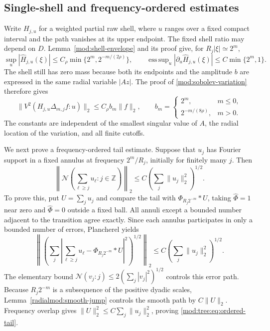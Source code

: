 \documentclass[11pt]{article}
\numberwithin{equation}{section}
\theoremstyle{remark}
\theoremstyle{definition}
\newcommand{\NN}{\mathcal N}
\DeclareMathOperator*{\esssup}{ess\,sup}
\begin{document}
\subsection{Single-shell and frequency-ordered estimates}

Write $H_{j,u}$ for a weighted partial raw shell, where $u$ ranges over
a fixed compact interval and the path vanishes at its upper endpoint.
The fixed shell ratio may depend on $D$. Lemma~\ref{mod:shell-envelope}
and its proof give, for $R_j|\xi|\simeq2^m$,
\[
 \sup_u|\widehat H_{j,u}(\xi)|
 \le C_\rho\min\{2^m,2^{-m/(2\rho)}\},\qquad
 \esssup_u|\partial_u\widehat H_{j,u}(\xi)|
 \le C\min\{2^m,1\}.
\]
The shell still has zero mass because both its endpoints and the
amplitude $b$ are expressed in the same radial variable $|Az|$.
The proof of \eqref{mod:sobolev-variation} therefore gives
\begin{equation}\label{mod:tree:eq:shell-short-input}
 \|V^2(H_{j,u}\Delta_{m,j}f:u)\|_2
 \le C_\rho b_m\|f\|_2,
 \qquad
 b_m=\begin{cases}2^m,&m\le0,\\2^{-m/(8\rho)},&m>0.\end{cases}
\end{equation}
The constants are independent of the smallest singular value of $A$,
the radial location of the variation, and all finite cutoffs.

We next prove a frequency-ordered tail estimate. Suppose that $u_j$ has
Fourier support in a fixed annulus at frequency $2^m/R_j$, initially
for finitely many $j$. Then
\begin{equation}\label{mod:tree:eq:ordered-tail}
 \left\|\NN\left(\sum_{\ell\ge j}u_\ell:j\in\mathbb Z\right)\right\|_2
 \le C\left(\sum_j\|u_j\|_2^2\right)^{1/2}.
\end{equation}
To prove this, put $U=\sum_ju_j$ and compare the tail with
$\Phi_{R_j2^{-m}}*U$, taking $\widehat\Phi=1$ near zero and
$\widehat\Phi=0$ outside a fixed ball. All annuli except a bounded
number adjacent to the transition agree exactly. Since each annulus
participates in only a bounded number of errors, Plancherel yields
\[
 \left\|\left(\sum_j\left|
   \sum_{\ell\ge j}u_\ell-\Phi_{R_j2^{-m}}*U
               \right|^2\right)^{1/2}\right\|_2
 \le C\left(\sum_j\|u_j\|_2^2\right)^{1/2}.
\]
The elementary bound $\NN(v_j:j)\le2(\sum_j|v_j|^2)^{1/2}$ controls
this error path. Because $R_j2^{-m}$ is a subsequence of the positive
dyadic scales, Lemma~\ref{radialmod:smooth-jump} controls the smooth
path by $C\|U\|_2$. Frequency overlap gives
$\|U\|_2^2\le C\sum_j\|u_j\|_2^2$, proving
\eqref{mod:tree:eq:ordered-tail}.
\end{document}
